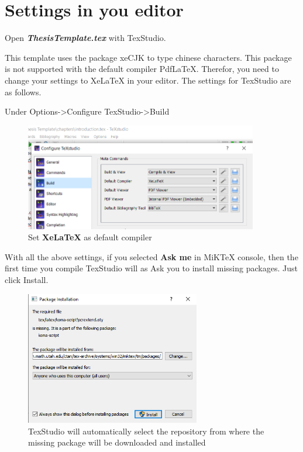 \section{Settings in you editor}
Open \textbf{\textit{ThesisTemplate.tex}} with TexStudio.

This template uses the package xeCJK to type chinese characters. This package is not supported with the default compiler PdfLaTeX. Therefor, you need to change your settings to XeLaTeX in your editor. The settings for TexStudio are as follows.

Under Options->Configure TexStudio->Build
\begin{figure}[!h]                      
	\centering                             
	\includegraphics[width = 4in]{figures/TexStudioConfig.png}
	\caption{Set \textbf{XeLaTeX} as default compiler}
	\label{fig:set_xelatex_as_default_compiler}                         
\end{figure}

With all the above settings, if you selected \textbf{Ask me} in MiKTeX console, then the first time you compile TexStudio will as Ask you to install missing packages. Just click  Install. 
\begin{figure}[h]                      
	\centering                             
	\includegraphics[width = 3in]{figures/InstallMissinPackages.png}
	\caption{TexStudio will automatically select the repository from where the missing package will be downloaded and installed}
	\label{figConquistador}                         
\end{figure} 
